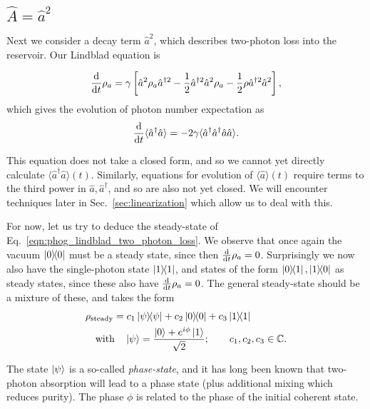 \FloatBarrier
\subsection{$\hat{A} = \hat{a}^2$}\label{sec:A_aa}
Next we consider a decay term $\hat{a}^2$, which describes two-photon loss into the reservoir. Our Lindblad equation is

\begin{equation}\label{eqn:phog_lindblad_two_photon_loss}
\frac{\mathrm{d}}{\mathrm{d}t} \rho_a = \gamma\left[\hat{a}^2 \rho_a \hat{a}^{\dagger 2} - \frac{1}{2} \hat{a}^{\dagger 2} \hat{a}^2 \rho_a - \frac{1}{2} \rho \hat{a}^{\dagger 2} \hat{a}^2\right],
\end{equation}
which gives the evolution of photon number expectation as 
\begin{equation}\label{eqn:aa_not_closed}
\frac{\mathrm{d}}{\mathrm{d}t} \langle \hat{a}^\dagger \hat{a}\rangle = - 2 \gamma \langle \hat{a}^\dagger \hat{a}^\dagger \hat{a}\hat{a}\rangle.
\end{equation}

\noindent This equation does not take a closed form, and so we cannot yet directly calculate $\langle \hat{a}^\dagger \hat{a}\rangle\left(t\right)$. Similarly, equations for evolution of $\langle\hat{a}\rangle\left(t\right)$ require terms to the third power in $\hat{a}, \hat{a}^\dagger$, and so are also not yet closed.  We will encounter techniques later in Sec.~\ref{sec:linearization} which allow us to deal with this.

For now, let us try to deduce the steady-state of Eq.~\ref{eqn:phog_lindblad_two_photon_loss}. We observe that once again the vacuum $\dyad{0}$ must be a steady state, since then $\frac{\mathrm{d}}{\mathrm{d}t} \rho_a=0$. Surprisingly we now also have the single-photon state $\dyad{1}$, and states of the form $\dyad{0}{1}, \dyad{1}{0}$ as steady states, since these also have $\frac{\mathrm{d}}{\mathrm{d}t} \rho_a=0$. The general steady-state should be a mixture of these, and takes the form
\begin{align}\label{eqn:phog_phase_state}
&\rho_{\text{steady}} = c_1 \dyad{\psi} + c_2 \dyad{0} + c_3 \dyad{1} \notag \\
%
&\qq{with} \ket{\psi} = \frac{\ket{0} + e^{i \phi} \ket{1}}{\sqrt{2}};  \qq{} c_1, c_2, c_3 \in \mathbb{C}.
\end{align}

\noindent The state $\ket{\psi}$ is a so-called \emph{phase-state}, and it has long been known that two-photon absorption will lead to a phase state \cite{Ezaki1999} (plus additional mixing \cite{Alexanian2000, Ezaki2000} which reduces purity). The phase $\phi$ is related to the phase of the initial coherent state. 

